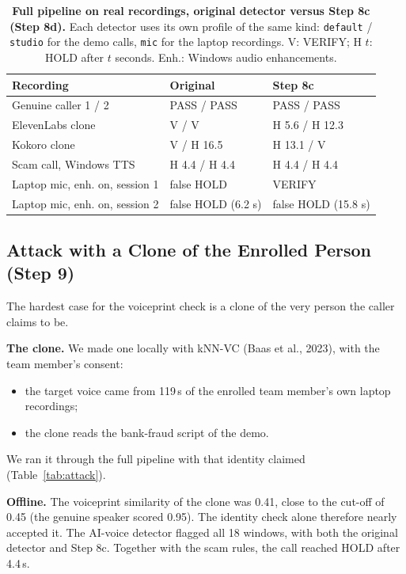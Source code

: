 \documentclass[10pt,a4paper,twocolumn]{article}
\begin{document}
\begin{table}[t]
\centering\footnotesize
\caption{\textbf{Full pipeline on real recordings, original detector versus Step 8c (Step 8d).} Each detector uses its own profile of the same kind: \texttt{default} / \texttt{studio} for the demo calls, \texttt{mic} for the laptop recordings. V: VERIFY; H $t$: HOLD after $t$ seconds. Enh.: Windows audio enhancements.}
\label{tab:live8c}
\setlength{\tabcolsep}{3pt}
\begin{tabular}{@{}p{}p{}p{}@{}}
\toprule
\textbf{Recording} & \textbf{Original} & \textbf{Step 8c}\\
\midrule
Genuine caller 1 / 2 & PASS / PASS & PASS / PASS\\
ElevenLabs clone & V / V & H 5.6 / H 12.3\\
Kokoro clone & V / H 16.5 & H 13.1 / V\\
Scam call, Windows TTS & H 4.4 / H 4.4 & H 4.4 / H 4.4\\
\midrule
Laptop mic, enh. on, session 1 & false HOLD & VERIFY\\
Laptop mic, enh. on, session 2 & false HOLD (6.2 s) & false HOLD (15.8 s)\\
\bottomrule
\end{tabular}
\end{table}

\subsection{Attack with a Clone of the Enrolled Person (Step 9)}
\label{sec:attack}
The hardest case for the voiceprint check is a clone of the very person the caller claims to be.

\textbf{The clone.} We made one locally with kNN-VC (Baas et al., 2023), with the team member's consent:
\begin{itemize}\setlength\itemsep{0pt}
\item the target voice came from 119\,s of the enrolled team member's own laptop recordings;
\item the clone reads the bank-fraud script of the demo.
\end{itemize}
We ran it through the full pipeline with that identity claimed (Table~\ref{tab:attack}).

\textbf{Offline.} The voiceprint similarity of the clone was 0.41, close to the cut-off of 0.45 (the genuine speaker scored 0.95). The identity check alone therefore nearly accepted it. The AI-voice detector flagged all 18 windows, with both the original detector and Step 8c. Together with the scam rules, the call reached HOLD after 4.4\,s.
\end{document}
